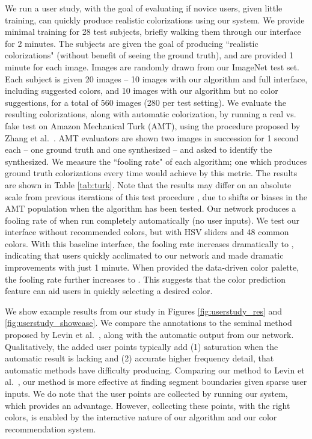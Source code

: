 \documentclass[acmtog,authorversion]{acmart}
\begin{document}
 
We run a user study, with the goal of evaluating if novice users, given little training, can quickly produce realistic colorizations using our system. We provide minimal training for 28 test subjects, briefly walking them through our interface for 2 minutes. The subjects are given the goal of producing ``realistic colorizations" (without benefit of seeing the ground truth), and are provided 1 minute for each image. Images are randomly drawn from our ImageNet test set. Each subject is given 20 images -- 10 images with our algorithm and full interface, including suggested colors, and 10 images with our algorithm but no color suggestions, for a total of 560 images (280 per test setting). We evaluate the resulting colorizations, along with automatic colorization, by running a real vs. fake test on Amazon Mechanical Turk (AMT), using the procedure proposed by Zhang et al.~. AMT evaluators are shown two images in succession for 1 second each -- one ground truth and one synthesized -- and asked to identify the synthesized. We measure the ``fooling rate" of each algorithm; one which produces ground truth colorizations every time would achieve  by this metric. The results are shown in Table \ref{tab:turk}. Note that the results may differ on an absolute scale from previous iterations of this test procedure \cite{zhang2016colorful,isola2016image}, due to shifts or biases in the AMT population when the algorithm has been tested. Our network produces a fooling rate of  when run completely automatically (no user inputs). We test our interface without recommended colors, but with HSV sliders and 48 common colors. With this baseline interface, the fooling rate increases dramatically to , indicating that users quickly acclimated to our network and made dramatic improvements with just 1 minute. When provided the data-driven color palette, the fooling rate further increases to . This suggests that the color prediction feature can aid users in quickly selecting a desired color.

We show example results from our study in Figures \ref{fig:userstudy_res} and \ref{fig:userstudy_showcase}. We compare the annotations to the seminal method proposed by Levin et al.~, along with the automatic output from our network. Qualitatively, the added user points typically add (1) saturation when the automatic result is lacking and (2) accurate higher frequency detail, that automatic methods have difficulty producing. Comparing our method to Levin et al.~, our method is more effective at finding segment boundaries given sparse user inputs. We do note that the user points are collected by running our system, which provides an advantage. However, collecting these points, with the right colors, is enabled by the interactive nature of our algorithm and our color recommendation system.
\end{document}
